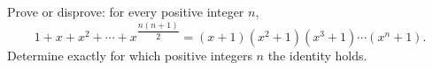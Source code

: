 Prove or disprove: for every positive integer $n$,
\[1+x+x^2+\cdots+x^{\dfrac{n(n+1)}{2}}=(x+1)(x^2+1)(x^3+1)\cdots(x^n+1).\]
Determine exactly for which positive integers $n$ the identity holds.
